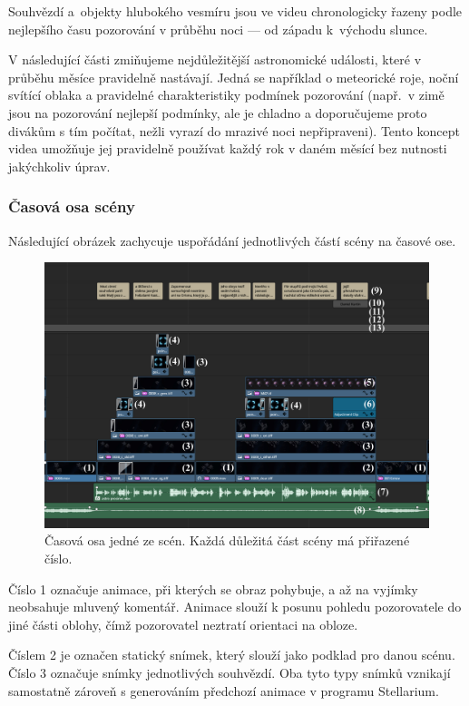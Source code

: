 \documentclass[12pt,a4paper,titlepage]{article}
\begin{document}
Souhvězdí a~objekty hlubokého vesmíru jsou ve videu chronologicky řazeny podle nejlepšího času pozorování v průběhu noci --- od západu k~východu slunce. 

V následující části zmiňujeme nejdůležitější astronomické události, které v průběhu měsíce pravidelně nastávají. Jedná se například o meteorické roje, noční svítící oblaka a pravidelné charakteristiky podmínek pozorování (např.\ v zimě jsou na pozorování nejlepší podmínky, ale je chladno a doporučujeme proto divákům s tím počítat, nežli vyrazí do mrazivé noci nepřipraveni). Tento koncept videa umožňuje jej pravidelně používat každý rok v daném měsící bez nutnosti jakýchkoliv úprav.

\subsubsection{Časová osa scény}\label{makingof:resolve:merging}
Následující obrázek zachycuje uspořádání jednotlivých částí scény na časové ose.

\begin{figure}[H]
	\centering
	\includegraphics[width=1\textwidth]{timeline_annotated.eps}
	\caption{Časová osa jedné ze scén. Každá důležitá část scény má přiřazené číslo.}\label{img:timeline}
\end{figure}
Číslo 1 označuje animace, při kterých se obraz pohybuje, a až na vyjímky neobsahuje mluvený komentář. Animace slouží k posunu pohledu pozorovatele do jiné části oblohy, čímž pozorovatel neztratí orientaci na obloze. 

Číslem 2 je označen statický snímek, který slouží jako podklad pro danou scénu. Číslo 3 označuje snímky jednotlivých souhvězdí. Oba tyto typy snímků vznikají samostatně zároveň s generováním předchozí animace v programu Stellarium.
\end{document}
